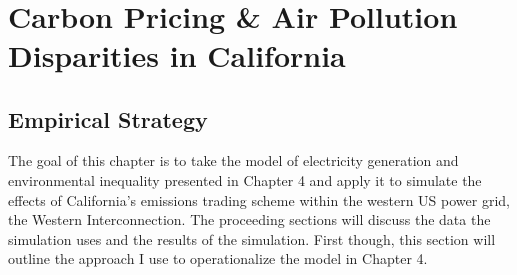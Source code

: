 ~
\newpage
\section{Carbon Pricing \& Air Pollution Disparities in California}

\subsection{Empirical Strategy}

The goal of this chapter is to take the model of electricity generation and environmental inequality presented in Chapter 4 and apply it to simulate the effects of California's emissions trading scheme within the western US power grid, the Western Interconnection. The proceeding sections will discuss the data the simulation uses and the results of the simulation. First though, this section will outline the approach I use to operationalize the model in Chapter 4. 

